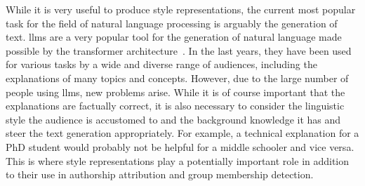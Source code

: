 While it is very useful to produce style representations, the current most popular task for the field of natural language processing is arguably the generation of text. \Acp{llm} are a very popular tool for the generation of natural language made possible by the transformer architecture~\cite{NIPS2017_3f5ee243}. In the last years, they have been used for various tasks by a wide and diverse range of audiences, including the explanations of many topics and concepts. However, due to the large number of people using \acp{llm}, new problems arise. While it is of course important that the explanations are factually correct, it is also necessary to consider the linguistic style the audience is accustomed to and the background knowledge it has and steer the text generation appropriately. For example, a technical explanation for a PhD student would probably not be helpful for a middle schooler and vice versa. This is where style representations play a potentially important role in addition to their use in authorship attribution and group membership detection.




